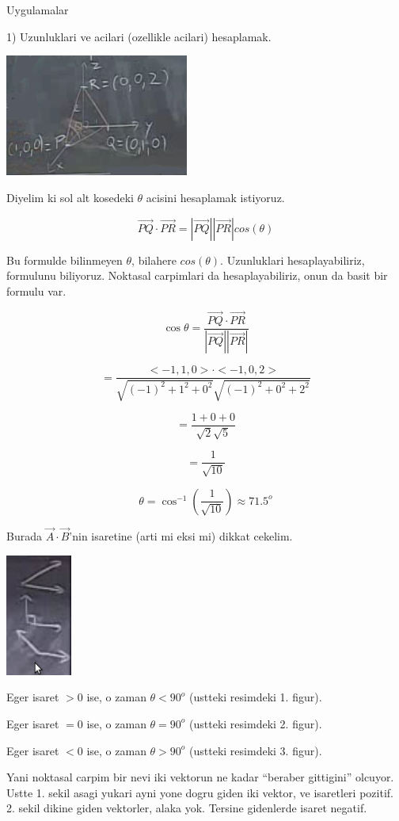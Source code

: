 \documentclass[12pt,fleqn]{article}\usepackage{../common}
\begin{document}
Uygulamalar

1) Uzunluklari ve acilari (ozellikle acilari) hesaplamak.

\includegraphics[height=4cm]{1_12.png}

Diyelim ki sol alt kosedeki $\theta$ acisini hesaplamak istiyoruz. 

\[ \vec{PQ} \cdot \vec{PR} = |\vec{PQ}||\vec{PR}|cos(\theta)  \]

Bu formulde bilinmeyen $\theta$, bilahere $cos(\theta)$. Uzunluklari
hesaplayabiliriz, formulunu biliyoruz. Noktasal carpimlari da
hesaplayabiliriz, onun da basit bir formulu var. 

\[ \cos\theta = \frac{\vec{PQ} \cdot \vec{PR}}{|\vec{PQ}||\vec{PR}|}\]

\[ = \frac{<-1,1,0>\cdot<-1,0,2>}
{  \sqrt{(-1)^2+1^2+0^2 }\sqrt{(-1)^2+0^2+2^2 }   } 
\]

\[ = \frac{1+0+0}{\sqrt{2}\sqrt{5}}  \]

\[ = \frac{1}{\sqrt{10}} \]

\[ \theta = \cos^{-1}(\frac{1}{\sqrt{10}}) \approx 71.5^o \]

Burada $\vec{A}\cdot\vec{B}$'nin isaretine (arti mi eksi mi) dikkat
cekelim. 

\includegraphics[height=4cm]{1_13.png}

Eger isaret $>0$ ise, o zaman $\theta < 90^o$ (ustteki resimdeki
1. figur). 

Eger isaret $=0$ ise, o zaman $\theta = 90^o$ (ustteki resimdeki
2. figur). 

Eger isaret $<0$ ise, o zaman $\theta > 90^o$ (ustteki resimdeki
3. figur). 

Yani noktasal carpim bir nevi iki vektorun ne kadar ``beraber gittigini''
olcuyor. Ustte 1. sekil asagi yukari ayni yone dogru giden iki vektor, ve
isaretleri pozitif. 2. sekil dikine giden vektorler, alaka yok. Tersine
gidenlerde isaret negatif. 
\end{document}
